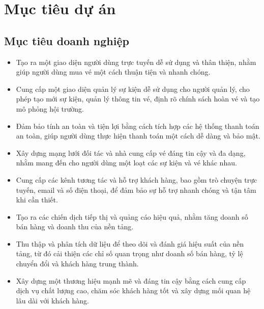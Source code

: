 \documentclass[12pt]{article}
\begin{document}
\section{Mục tiêu dự án}

\subsection{Mục tiêu doanh nghiệp}
\begin{itemize}[label=-, leftmargin=1cm]
\item Tạo ra một giao diện người dùng trực tuyến dễ sử dụng và thân thiện, nhằm giúp người dùng mua vé một cách thuận tiện và nhanh chóng.
\item Cung cấp một giao diện quản lý sự kiện dễ sử dụng cho người quản lý, cho phép tạo mới sự kiện, quản lý thông tin vé, định rõ chính sách hoàn vé và tạo mô phỏng hội trường.
\item Đảm bảo tính an toàn và tiện lợi bằng cách tích hợp các hệ thống thanh toán an toàn, giúp người dùng thực hiện thanh toán một cách dễ dàng và bảo mật.
\item Xây dựng mạng lưới đối tác và nhà cung cấp vé đáng tin cậy và đa dạng, nhằm mang đến cho người dùng một loạt các sự kiện và vé khác nhau.
\item Cung cấp các kênh tương tác và hỗ trợ khách hàng, bao gồm trò chuyện trực tuyến, email và số điện thoại, để đảm bảo sự hỗ trợ nhanh chóng và tận tâm khi cần thiết.
\item Tạo ra các chiến dịch tiếp thị và quảng cáo hiệu quả, nhằm tăng doanh số bán hàng và doanh thu của nền tảng.
\item Thu thập và phân tích dữ liệu để theo dõi và đánh giá hiệu suất của nền tảng, từ đó cải thiện các chỉ số quan trọng như doanh số bán hàng, tỷ lệ chuyển đổi và khách hàng trung thành.
\item Xây dựng một thương hiệu mạnh mẽ và đáng tin cậy bằng cách cung cấp dịch vụ chất lượng cao, chăm sóc khách hàng tốt và xây dựng mối quan hệ lâu dài với khách hàng.
\end{itemize}
\end{document}
